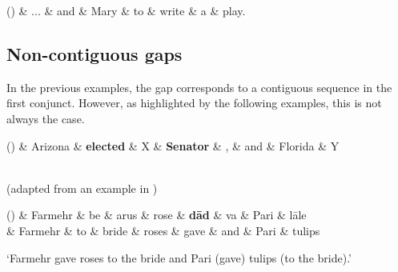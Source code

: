 \documentclass[11pt]{article}
\newenvironment{myquote}%
  {\list{}{\leftmargin=0.0in\rightmargin=0.0in}\item[]}%
  {\endlist}
\newcounter{excounter}
\begin{document}
\begin{myquote}
  \label{ex:en-gap-5}
  \footnotesize
  \begin{dependency}[edge unit distance=2.5ex]
    \begin{deptext}[column sep=0.3cm]
      (\theexcounter) \& ... \& and \& Mary \& to \& write \& a \& play. \\
    \end{deptext}
  \end{dependency}
\end{myquote}

\subsection{Non-contiguous gaps}

In the previous examples, the gap corresponds to a contiguous sequence in 
the first conjunct. However, as highlighted by the following examples, this is 
not always the case.

\begin{myquote}
  \label{ex:en-gap-6}
  \footnotesize
  \begin{dependency}
    \begin{deptext}
      (\theexcounter) \& Arizona \& \textbf{elected} \& X \& \textbf{Senator} \& , \& and \& Florida \& Y \\
    \end{deptext}
  \end{dependency}
  \\ \null \hfill (adapted from an example in )
\end{myquote}

\begin{myquote}
  \label{ex:persian-gap-1}
  \footnotesize
  \begin{dependency}
    \begin{deptext}
      (\theexcounter) \& Farmehr \& be \& arus \& rose \& \textbf{d\={a}d} \& va \& Pari \& l\={a}le \\
      \&         Farmehr  \& to  \& bride \& roses \& gave \& and \& Pari \& tulips \\
    \end{deptext}
  \end{dependency}
  `Farmehr gave roses to the bride and Pari (gave) tulips (to the bride).' \hfill \cite{Farudi2013}
\end{myquote}
\end{document}
